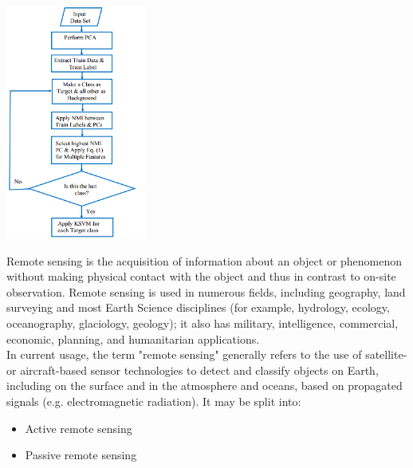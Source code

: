 \documentclass[landscape,a0paper,fontscale=0.285]{baposter} %
\newcommand{\compresslist}{ %
\setlength{\itemsep}{1pt}
\setlength{\parskip}{0pt}
\setlength{\parsep}{0pt}
}
\begin{document}
\begin{poster}
{\begin{multicols}{2}
\iffalse
\begin{center}
	\includegraphics[width=1\linewidth, height = 7.7cm, keepaspectratio]{flow.png}
\end{center}

Remote sensing is the acquisition of information about an object or phenomenon without making physical contact with the object and thus in contrast to on-site observation. Remote sensing is used in numerous fields, including geography, land surveying and most Earth Science disciplines (for example, hydrology, ecology, oceanography, glaciology, geology); it also has military, intelligence, commercial, economic, planning, and humanitarian applications.\\

In current usage, the term "remote sensing" generally refers to the use of satellite- or aircraft-based sensor technologies to detect and classify objects on Earth, including on the surface and in the atmosphere and oceans, based on propagated signals (e.g. electromagnetic radiation). It may be split into:
\begin{itemize}\compresslist	
	\item Active remote sensing
	\item Passive remote sensing
\end{itemize}


\end{multicols}}
\end{poster}
\end{document}
